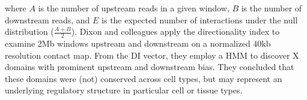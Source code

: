 where $A$ is the number of upstream reads in a given window, $B$ is the number of downstream reads, and $E$ is the expected number of interactions under
the null distribution ($\frac{A + B}{2}$).  Dixon and colleagues apply the directionality index to examine 2Mb windows upstream and downstream on a
normalized 40kb resolution contact map.  From the \gls{DI} vector, they employ a \gls{HMM} to discover X domains with prominent upstream and downstream bias.
They concluded that these domains were (not) conserved across cell types, but may represent an underlying regulatory structure in particular cell or tissue
types\cite{dixon2012}.
